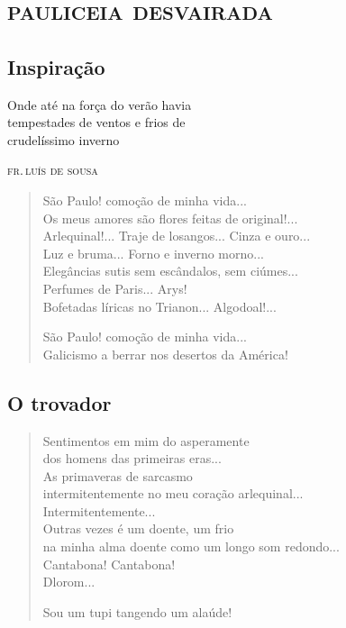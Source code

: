 \part{\textsc{pauliceia desvairada}}

\chapter{Inspiração}
\openany

\epigraph{Onde até na força do verão havia\\
tempestades de ventos e frios de\\
crudelíssimo inverno}{\textsc{fr.\,luís de sousa}}


\begin{verse}
São Paulo! comoção de minha vida...\\
Os meus amores são flores feitas de original!...\\
Arlequinal!... Traje de losangos... Cinza e ouro...\\
Luz e bruma... Forno e inverno morno...\\
Elegâncias sutis sem escândalos, sem ciúmes...\\
Perfumes de Paris... Arys!\\
Bofetadas líricas no Trianon... Algodoal!...

São Paulo! comoção de minha vida...\\
Galicismo a berrar nos desertos da América!
\end{verse}

\chapter{O trovador}

\begin{verse}
Sentimentos em mim do asperamente\\
dos homens das primeiras eras...\\
As primaveras de sarcasmo\\
intermitentemente no meu coração arlequinal...\\
Intermitentemente...\\
Outras vezes é um doente, um frio\\
na minha alma doente como um longo som redondo...\\
Cantabona! Cantabona!\\
Dlorom...

Sou um tupi tangendo um alaúde!
\end{verse}

